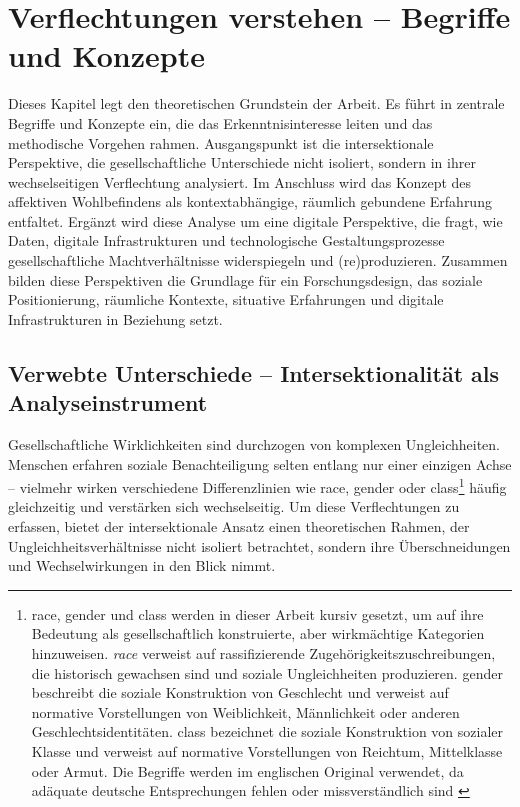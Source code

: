 
\chapter{Verflechtungen verstehen -- Begriffe und Konzepte} \label{sec:theoretischer_rahmen}

Dieses Kapitel legt den theoretischen Grundstein der Arbeit. Es führt in zentrale Begriffe und Konzepte ein, die das Erkenntnisinteresse leiten und das methodische Vorgehen rahmen. Ausgangspunkt ist die intersektionale Perspektive, die gesellschaftliche Unterschiede nicht isoliert, sondern in ihrer wechselseitigen Verflechtung analysiert. Im Anschluss wird das Konzept des affektiven Wohlbefindens als kontextabhängige, räumlich gebundene Erfahrung entfaltet. Ergänzt wird diese Analyse um eine digitale Perspektive, die fragt, wie Daten, digitale Infrastrukturen und technologische Gestaltungsprozesse gesellschaftliche Machtverhältnisse widerspiegeln und (re)produzieren. Zusammen bilden diese Perspektiven die Grundlage für ein Forschungsdesign, das soziale Positionierung, räumliche Kontexte, situative Erfahrungen und digitale Infrastrukturen in Beziehung setzt.

\section{Verwebte Unterschiede -- Intersektionalität als Analyseinstrument}

Gesellschaftliche Wirklichkeiten sind durchzogen von komplexen Ungleichheiten. Menschen erfahren soziale Benachteiligung selten entlang nur einer einzigen Achse -- vielmehr wirken verschiedene Differenzlinien wie \gls{race}, \gls{gender} oder \gls{class}\footnote{\gls{race}, \gls{gender} und \gls{class} werden in dieser Arbeit kursiv gesetzt, um auf ihre Bedeutung als gesellschaftlich konstruierte, aber wirkmächtige Kategorien hinzuweisen. \textit{race} verweist auf rassifizierende Zugehörigkeitszuschreibungen, die historisch gewachsen sind und soziale Ungleichheiten produzieren. \gls{gender} beschreibt die soziale Konstruktion von Geschlecht und verweist auf normative Vorstellungen von Weiblichkeit, Männlichkeit oder anderen Geschlechtsidentitäten. \gls{class} bezeichnet die soziale Konstruktion von sozialer Klasse und verweist auf normative Vorstellungen von Reichtum, Mittelklasse oder Armut. Die Begriffe werden im englischen Original verwendet, da adäquate deutsche Entsprechungen fehlen oder missverständlich sind \parencite[\gls{vgl}][]{hallRaceArticulationSocieties1980, butlerGenderTroubleFeminism1990}} häufig gleichzeitig und verstärken sich wechselseitig. Um diese Verflechtungen zu erfassen, bietet der intersektionale Ansatz einen theoretischen Rahmen, der Ungleichheitsverhältnisse nicht isoliert betrachtet, sondern ihre Überschneidungen und Wechselwirkungen in den Blick nimmt.

